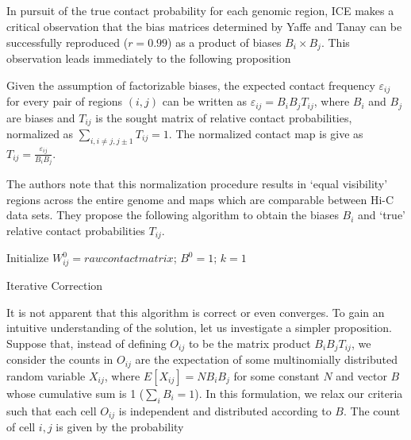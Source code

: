 \subsection*{}

In pursuit of the true contact probability for each genomic region, \gls{ICE} makes a critical observation that the bias matrices determined by
Yaffe and Tanay \citep{yaffe2011} can be successfully reproduced ($r = 0.99$) as a product of biases $B_i \times B_j$.  This observation leads
immediately to the following proposition

\begin{prop}
  Given the assumption of factorizable biases, the expected contact frequency $\varepsilon_{ij}$ for every pair of regions $(i,j)$ can
  be written as $\varepsilon_{ij} = B_{i}B_{j}T_{ij}$, where $B_i$ and $B_j$ are biases and $T_{ij}$ is the sought matrix of relative contact
  probabilities, normalized as $\sum_{i, i \neq j, j \pm 1}T_{ij} = 1$.  The normalized contact map is give as
  $T_{ij} = \frac{\varepsilon_{ij}}{B_{i}B_{j}}$.
\end{prop}

The authors note that this normalization procedure results in `equal visibility' regions across the entire genome and maps which are
comparable between Hi-C data sets.  They propose the following algorithm to obtain the biases $B_i$ and `true' relative contact probabilities
$T_{ij}$.

\begin{algorithm}[H]
  Initialize $W^{0}_{ij} = raw contact matrix$; $B^0 = 1$; $k = 1$\;
  \caption{Iterative Correction}
\end{algorithm}

It is not apparent that this algorithm is correct or even converges.  To gain an intuitive understanding of the solution, let us investigate a
simpler proposition.  Suppose that, instead of defining $O_{ij}$ to be the matrix product $B_{i}B_{j}T_{ij}$, we consider the counts
in $O_{ij}$ are the expectation of some multinomially distributed random variable $X_{ij}$, where $E[X_{ij}] = NB_{i}B_j$ for some
constant $N$ and vector $B$ whose cumulative sum is 1 ($\sum_{i}B_i = 1$).  In this formulation, we relax our criteria such that each cell
$O_{ij}$ is independent and distributed according to $B$.  The count of cell $i,j$ is given by the probability

